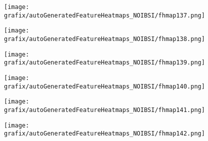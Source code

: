 \hspace{\hsp} 
\begin{subfigure}{\wid\textwidth} 
    \centering 
    \caption{\tiny \sffamily {}} 
    \vspace{\vsp} 
    \texttt{[image: grafix/autoGeneratedFeatureHeatmaps\_NOIBSI/fhmap137.png]} 
\end{subfigure} 
\hspace{\hsp} 
\begin{subfigure}{\wid\textwidth} 
    \centering 
    \caption{\tiny \sffamily {}} 
    \vspace{\vsp} 
    \texttt{[image: grafix/autoGeneratedFeatureHeatmaps\_NOIBSI/fhmap138.png]} 
\end{subfigure} 
\hspace{\hsp} 
\begin{subfigure}{\wid\textwidth} 
    \centering 
    \caption{\tiny \sffamily {}} 
    \vspace{\vsp} 
    \texttt{[image: grafix/autoGeneratedFeatureHeatmaps\_NOIBSI/fhmap139.png]} 
\end{subfigure} 
\hspace{\hsp} 
\begin{subfigure}{\wid\textwidth} 
    \centering 
    \caption{\tiny \sffamily {}} 
    \vspace{\vsp} 
    \texttt{[image: grafix/autoGeneratedFeatureHeatmaps\_NOIBSI/fhmap140.png]} 
\end{subfigure} 
\hspace{\hsp} 
\begin{subfigure}{\wid\textwidth} 
    \centering 
    \caption{\tiny \sffamily {}} 
    \vspace{\vsp} 
    \texttt{[image: grafix/autoGeneratedFeatureHeatmaps\_NOIBSI/fhmap141.png]} 
\end{subfigure} 
\hspace{\hsp} 
\begin{subfigure}{\wid\textwidth} 
    \centering 
    \caption{\tiny \sffamily {}} 
    \vspace{\vsp} 
    \texttt{[image: grafix/autoGeneratedFeatureHeatmaps\_NOIBSI/fhmap142.png]} 
\end{subfigure} 
\hspace{\hsp} 
